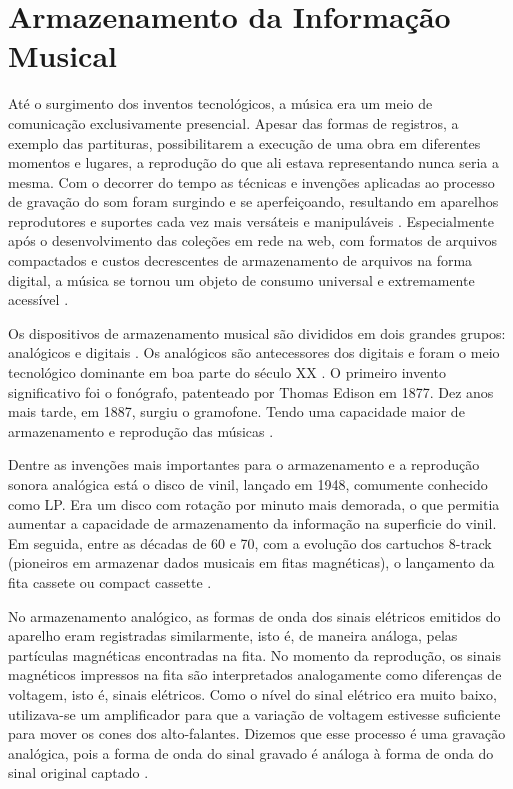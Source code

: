 \section{Armazenamento da Informação Musical}

Até o surgimento dos inventos tecnológicos, a música era um meio de comunicação exclusivamente presencial. Apesar das formas de registros, a exemplo das partituras, possibilitarem a execução de uma obra em diferentes momentos e lugares, a reprodução do que ali estava representando nunca seria a mesma. Com o decorrer do tempo as técnicas e invenções aplicadas ao processo de gravação do som foram surgindo e se aperfeiçoando, resultando em aparelhos reprodutores e suportes cada vez mais versáteis e manipuláveis \cite{daquino2012}. Especialmente após o desenvolvimento das coleções em rede na web, com formatos de arquivos compactados e custos decrescentes de armazenamento de arquivos na forma digital, a música se tornou um objeto de consumo universal e extremamente acessível \cite{gomes2015}.

Os dispositivos de armazenamento musical são divididos em dois grandes grupos: analógicos e digitais \cite{andrade&crispim2008}. Os analógicos são antecessores dos digitais e foram o meio tecnológico dominante em boa parte do século XX \cite{paulozuben2004}. O primeiro invento significativo foi o fonógrafo, patenteado por Thomas Edison em 1877. Dez anos mais tarde, em 1887, surgiu o gramofone. Tendo uma capacidade maior de armazenamento e reprodução das músicas \cite{marchi2005}. 

Dentre as invenções mais importantes para o armazenamento e a reprodução sonora analógica está o disco de vinil, lançado em 1948, comumente conhecido como LP. Era um disco com rotação por minuto mais demorada, o que permitia aumentar a capacidade de armazenamento da informação na superficie do vinil. Em seguida, entre as décadas de 60 e 70, com a evolução dos cartuchos 8-track (pioneiros em armazenar dados musicais em fitas magnéticas), o lançamento da fita cassete ou compact cassette \cite{marchi2005}.

No armazenamento analógico, as formas de onda dos sinais elétricos emitidos do aparelho eram registradas similarmente, isto é, de maneira análoga, pelas partículas magnéticas encontradas na fita. No momento da reprodução, os sinais magnéticos impressos na fita são interpretados analogamente como diferenças de voltagem, isto é, sinais elétricos. Como o nível do sinal elétrico era muito baixo, utilizava-se um amplificador para que a variação de voltagem estivesse suficiente para mover os cones dos alto-falantes. Dizemos que esse processo é uma gravação analógica, pois a forma de onda do sinal gravado é análoga à forma de onda do sinal original captado \cite{paulozuben2004}.

